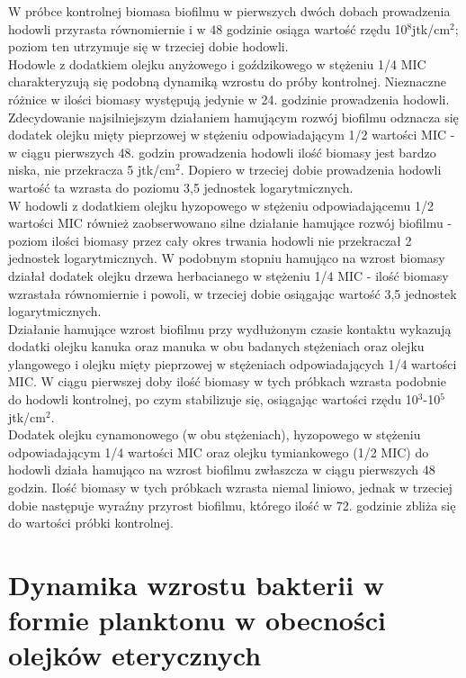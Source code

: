 \documentclass[11pt,a4paper]{report}
\begin{document}
\clearpage
W próbce kontrolnej biomasa biofilmu w pierwszych dwóch dobach prowadzenia hodowli przyrasta równomiernie i w 48 godzinie osiąga wartość rzędu 10$^8$jtk/cm$^2$; poziom ten utrzymuje się w trzeciej dobie hodowli.\\
Hodowle z dodatkiem olejku anyżowego i goździkowego w stężeniu 1/4 MIC charakteryzują się podobną dynamiką wzrostu do próby kontrolnej. Nieznaczne różnice w ilości biomasy występują jedynie w 24. godzinie prowadzenia hodowli.\\
Zdecydowanie najsilniejszym działaniem hamującym rozwój biofilmu odznacza się dodatek olejku mięty pieprzowej w stężeniu odpowiadającym 1/2 wartości MIC - w ciągu pierwszych 48. godzin prowadzenia hodowli ilość biomasy jest bardzo niska, nie przekracza 5 jtk/cm$^2$. Dopiero w trzeciej dobie prowadzenia hodowli wartość ta wzrasta do poziomu 3,5 jednostek logarytmicznych.\\
W hodowli z dodatkiem olejku hyzopowego w stężeniu odpowiadającemu 1/2 wartości MIC również zaobserwowano silne działanie hamujące rozwój biofilmu - poziom ilości biomasy przez cały okres trwania hodowli nie przekraczał 2 jednostek logarytmicznych. W podobnym stopniu hamująco na wzrost biomasy działał dodatek olejku drzewa herbacianego w stężeniu 1/4 MIC - ilość biomasy wzrastała równomiernie i powoli, w trzeciej dobie osiągając wartość 3,5 jednostek logarytmicznych.\\
Działanie hamujące  wzrost biofilmu przy wydłużonym czasie kontaktu wykazują dodatki olejku kanuka oraz manuka w obu badanych stężeniach oraz olejku ylangowego i olejku mięty pieprzowej w stężeniach odpowiadających 1/4 wartości MIC. W ciągu pierwszej doby ilość biomasy w tych próbkach wzrasta podobnie do hodowli kontrolnej, po czym stabilizuje się, osiągając wartości rzędu 10$^3$-10$^5$jtk/cm$^2$.\\
Dodatek olejku cynamonowego (w obu stężeniach), hyzopowego w stężeniu odpowiadającym 1/4 wartości MIC oraz olejku tymiankowego (1/2 MIC) do hodowli działa hamująco na wzrost biofilmu zwłaszcza w ciągu pierwszych 48 godzin. Ilość biomasy w tych próbkach wzrasta niemal liniowo, jednak w trzeciej dobie następuje wyraźny przyrost biofilmu, którego ilość w 72. godzinie zbliża się do wartości próbki kontrolnej.
\clearpage

\section{Dynamika wzrostu bakterii w formie planktonu w obecności olejków eterycznych}
\end{document}
